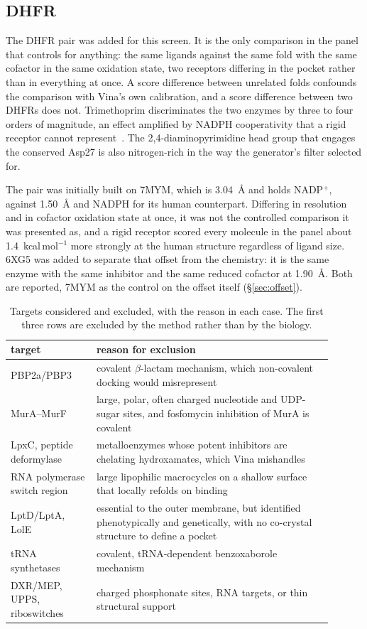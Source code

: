 \documentclass[11pt,a4paper]{article}
\begin{document}
\subsection{DHFR}

The DHFR pair was added for this screen. It is the only comparison in the
panel that controls for anything: the same ligands against the same fold with
the same cofactor in the same oxidation state, two receptors differing in the
pocket rather than in everything at once. A score difference between unrelated
folds confounds the comparison with Vina's own calibration, and a score
difference between two DHFRs does not. Trimethoprim discriminates the two enzymes by three to four
orders of magnitude, an effect amplified by NADPH cooperativity that a rigid
receptor cannot represent~\cite{wrobel2020}. The 2,4-diaminopyrimidine head
group that engages the conserved Asp27 is also nitrogen-rich in the way the
generator's filter selected for.

The pair was initially built on 7MYM, which is 3.04~\AA{} and holds NADP$^+$,
against 1.50~\AA{} and NADPH for its human counterpart. Differing in resolution
and in cofactor oxidation state at once, it was not the controlled comparison
it was presented as, and a rigid receptor scored every molecule in the panel
about 1.4~kcal\,mol$^{-1}$ more strongly at the human structure regardless of
ligand size. 6XG5 was added to separate that offset from the chemistry: it is
the same enzyme with the same inhibitor and the same reduced cofactor at
1.90~\AA. Both are reported, 7MYM as the control on the offset itself
(\S\ref{sec:offset}).

\begin{table}[tb]
\centering
\caption{Targets considered and excluded, with the reason in each case. The
first three rows are excluded by the method rather than by the biology.}
\label{tab:rejected}
\small
\begin{tabular}{p{0.24\linewidth}p{0.66\linewidth}}
\toprule
target & reason for exclusion \\
\midrule
PBP2a/PBP3 & covalent $\beta$-lactam mechanism, which non-covalent docking
would misrepresent \\
MurA--MurF & large, polar, often charged nucleotide and UDP-sugar sites, and
fosfomycin inhibition of MurA is covalent \\
LpxC, peptide deformylase & metalloenzymes whose potent inhibitors are
chelating hydroxamates, which Vina mishandles \\
RNA polymerase switch region & large lipophilic macrocycles on a shallow
surface that locally refolds on binding \\
LptD/LptA, LolE & essential to the outer membrane, but identified
phenotypically and genetically, with no co-crystal structure to define a
pocket \\
tRNA synthetases & covalent, tRNA-dependent benzoxaborole mechanism \\
DXR/MEP, UPPS, riboswitches & charged phosphonate sites, RNA targets, or thin
structural support \\
\bottomrule
\end{tabular}
\end{table}
\end{document}
